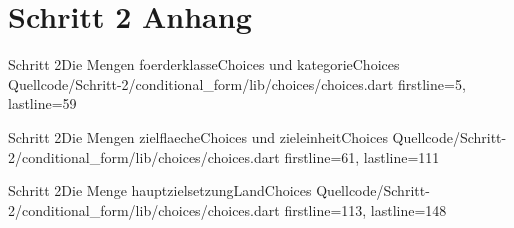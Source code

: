 \chapter{Schritt 2 Anhang} 
\label{appendix:Schritt2Anhang}

\begin{alexlisting}{Schritt 2}{Die Mengen foerderklasseChoices und kategorieChoices }
    {Quellcode/Schritt-2/conditional_form/lib/choices/choices.dart}
    {firstline=5, lastline=59}
    \label{lst:Schritt2FoerderklasseChoicesKategorieChoices}
\end{alexlisting}

\begin{alexlisting}{Schritt 2}{Die Mengen zielflaecheChoices und zieleinheitChoices}
    {Quellcode/Schritt-2/conditional_form/lib/choices/choices.dart}
    {firstline=61, lastline=111}
    \label{lst:Schritt2ZielflaecheChoicesZieleinheitChoices}
\end{alexlisting}

\begin{alexlisting}{Schritt 2}{Die Menge hauptzielsetzungLandChoices}
    {Quellcode/Schritt-2/conditional_form/lib/choices/choices.dart}
    {firstline=113, lastline=148}
    \label{lst:Schritt2hauptzielsetzungLandChoices}
\end{alexlisting}